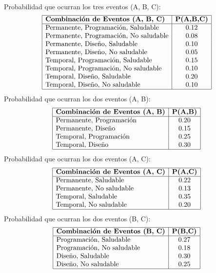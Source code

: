 \documentclass{article}
\begin{document}
\\[12pt]
Probabilidad que ocurran los tres eventos (A, B, C):
\[
\begin{array}{|l|c|}
\hline
\textbf{Combinación de Eventos (A, B, C)} & \textbf{P(A,B,C)} \\
\hline
\text{Permanente, Programación, Saludable} & 0.12 \\
\text{Permanente, Programación, No saludable} & 0.08 \\
\text{Permanente, Diseño, Saludable} & 0.10 \\
\text{Permanente, Diseño, No saludable} & 0.05 \\
\text{Temporal, Programación, Saludable} & 0.15 \\
\text{Temporal, Programación, No saludable} & 0.10 \\
\text{Temporal, Diseño, Saludable} & 0.20 \\
\text{Temporal, Diseño, No saludable} & 0.10 \\
\hline
\end{array}
\]
Probabilidad que ocurran los dos eventos (A, B):
\[
\begin{array}{|l|c|}
\hline
\textbf{Combinación de Eventos (A, B)} & \textbf{P(A,B)} \\
\hline
\text{Permanente, Programación} & 0.20 \\
\text{Permanente, Diseño} & 0.15 \\
\text{Temporal, Programación} & 0.25 \\
\text{Temporal, Diseño} & 0.30 \\
\hline
\end{array}
\]
Probabilidad que ocurran los dos eventos (A, C):
\[
\begin{array}{|l|c|}
\hline
\textbf{Combinación de Eventos (A, C)} & \textbf{P(A,C)} \\
\hline
\text{Permanente, Saludable} & 0.22 \\
\text{Permanente, No saludable} & 0.13 \\
\text{Temporal, Saludable} & 0.35 \\
\text{Temporal, No saludable} & 0.20 \\
\hline
\end{array}
\]
Probabilidad que ocurran los dos eventos (B, C):
\[
\begin{array}{|l|c|}
\hline
\textbf{Combinación de Eventos (B, C)} & \textbf{P(B,C)} \\
\hline
\text{Programación, Saludable} & 0.27 \\
\text{Programación, No saludable} & 0.18 \\
\text{Diseño, Saludable} & 0.30 \\
\text{Diseño, No saludable} & 0.25 \\
\hline
\end{array}
\]
\end{document}
